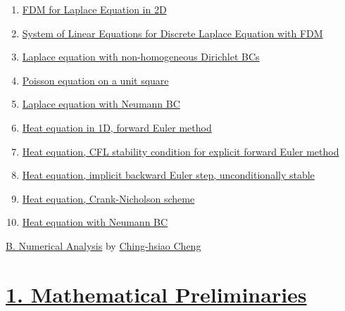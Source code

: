 \documentclass[11pt]{article}
\begin{document}
\begin{multicols}{2}
	\begin{enumerate}
		\item \href{https://mp.weixin.qq.com/s/GYxDOVdBZ-yz0AldbRzKfw}{FDM for Laplace Equation in 2D}	%
		\item \href{https://mp.weixin.qq.com/s/3dHQIBRT1jz5puezMADdUw}{System of Linear Equations for Discrete Laplace Equation with FDM}	%
		\item \href{https://mp.weixin.qq.com/s/CmM-GYuzoWVd5rCHPgEC7A}{Laplace equation with non-homogeneous Dirichlet BCs}	%
		\item \href{https://mp.weixin.qq.com/s/n3VHX-ZthlABzNen_NnAfQ}{Poisson equation on a unit square}	%
		\item \href{https://mp.weixin.qq.com/s/8DiZQA7OD156V2Q4qxdVag}{Laplace equation with Neumann BC}	%
		\item \href{https://mp.weixin.qq.com/s/JoE1-6NE2cNPj0MJFWq5GQ}{Heat equation in 1D, forward Euler method}	%
		\item \href{https://mp.weixin.qq.com/s/ef-e0SnuAB4cjJ_lJC84QA}{Heat equation, CFL stability condition for explicit forward Euler method}	%
		\item \href{https://mp.weixin.qq.com/s/k_O9jjISbrII1ur7B9lYoQ}{Heat equation, implicit backward Euler step, unconditionally stable}	%
		\item \href{https://mp.weixin.qq.com/s/r9P8c6EtdQxUzLoaOeO1xA}{Heat equation, Crank-Nicholson scheme}	%
		\item \href{https://mp.weixin.qq.com/s/8HBzNrEH18BdJ-dgltxWtA}{Heat equation with Neumann BC}	%
	\end{enumerate}
\end{multicols}


\newpage 

\begin{center}
	{\Large \href{http://www.math.ncu.edu.tw/~cchsiao/Course/Numerical_Analysis_082/index.html}{B. Numerical Analysis}} {\large by \href{http://www.math.ncu.edu.tw/~cchsiao/}{Ching-hsiao Cheng}}
\end{center}

\vspace{-1cm}

\section*{\href{https://www.youtube.com/playlist?list=PLGwoNNTgFGehjEtt_1jijzMQslt7NV-Oh}{1. Mathematical Preliminaries}} %
\end{document}

